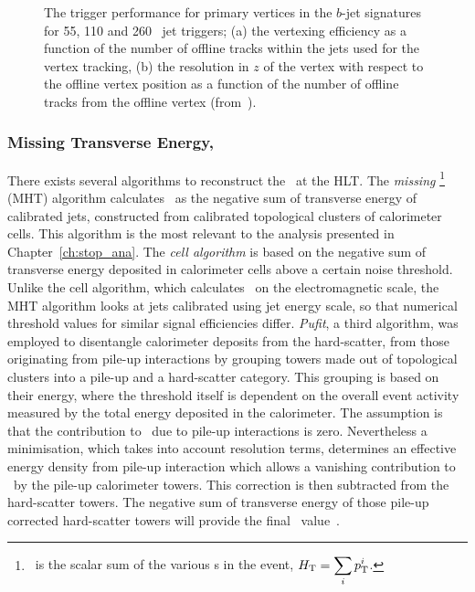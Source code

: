 				\begin{figure}[!htb]
					\begin{center}
						\hspace{0.05\textwidth}
					\end{center}
					\caption{The trigger performance for primary vertices in the $b$-jet signatures for 55, 110 and 260 \GeV\ jet triggers; (a) the vertexing efficiency as a function of the number of offline tracks within the jets used for the vertex tracking, (b) the resolution in $z$ of the vertex with respect to the offline vertex position as a function of the number of offline tracks from the offline vertex (from~\cite{ATLASTrigger2015}).}
					\label{fig:bjetvertex}
				\end{figure}

			\subsubsection*{Missing Transverse Energy, \met}

				There exists several algorithms to reconstruct the \met\ at the \ac{HLT}. The \textit{missing} \HT\footnote{\HT\ is the scalar sum of the various \pt s in the event, $\displaystyle H_{\mathrm{T}} = \sum_{i} p_{\mathrm{T}}^i$.} (MHT) algorithm calculates \met\ as the negative sum of transverse energy of calibrated jets, constructed from calibrated topological clusters of calorimeter cells. This algorithm is the most relevant to the analysis presented in Chapter~\ref{ch:stop_ana}. The \textit{cell algorithm} is based on the negative sum of transverse energy deposited in calorimeter cells above a certain noise threshold. Unlike the cell algorithm, which calculates \met\ on the electromagnetic scale, the MHT algorithm looks at jets calibrated using jet energy scale, so that numerical threshold values for similar signal efficiencies differ. \textit{Pufit}, a third algorithm, was employed to disentangle calorimeter deposits from the hard-scatter, from those originating from pile-up interactions by grouping towers made out of topological clusters into a pile-up and a hard-scatter category. This grouping is based on their energy, where the threshold itself is dependent on the overall event activity measured by the total energy deposited in the calorimeter. The assumption is that the contribution to \met\ due to pile-up interactions is zero. Nevertheless a minimisation, which takes into account resolution terms, determines an effective energy density from pile-up interaction which allows a vanishing contribution to \met\ by the pile-up calorimeter towers. This correction is then subtracted from the hard-scatter towers. The negative sum of transverse energy of those pile-up corrected hard-scatter towers will provide the final \met\ value~\cite{ATL-COM-DAQ-2016-137}.


